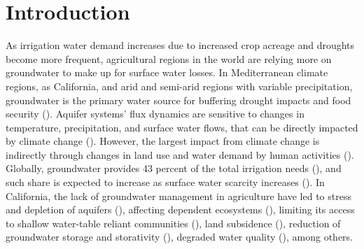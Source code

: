 \documentclass[11pt,a4paper]{article}
\begin{document}
\section{Introduction}

As irrigation water demand increases due to increased crop acreage and droughts become more frequent, agricultural regions in the world are relying more on groundwater to make up for surface water losses. In Mediterranean climate regions, as California, and arid and semi-arid regions with variable precipitation, groundwater is the primary water source for buffering drought impacts and food security (\cite{malmgren_groundwater_2022,priyan_issues_2021}). Aquifer systems’ flux dynamics are sensitive to changes in temperature, precipitation, and surface water flows, that can be directly impacted by climate change (\cite{cuthbert_global_2019,wu_divergent_2020}). However, the largest impact from climate change is indirectly through changes in land use and water demand by human activities (\cite{taylor_ground_2013}). Globally, groundwater provides 43 percent of the total irrigation needs (\cite{siebert_groundwater_2010}), and such share is expected to increase as surface water scarcity increases (\cite{wada_nonsustainable_2012}). In California, the lack of groundwater management in agriculture have led to stress and depletion of aquifers (\cite{vasco_satellite-based_2019}), affecting dependent ecosystems (\cite{bierkens_non-renewable_2019}), limiting its access to shallow water-table reliant communities (\cite{pauloo_domestic_2020,perrone_dry_2017}), land subsidence (\cite{smith_groundwater_2020}), reduction of groundwater storage and storativity (\cite{alam_post-drought_2021}), degraded water quality (\cite{levy_critical_2021}), among others. 
\end{document}
